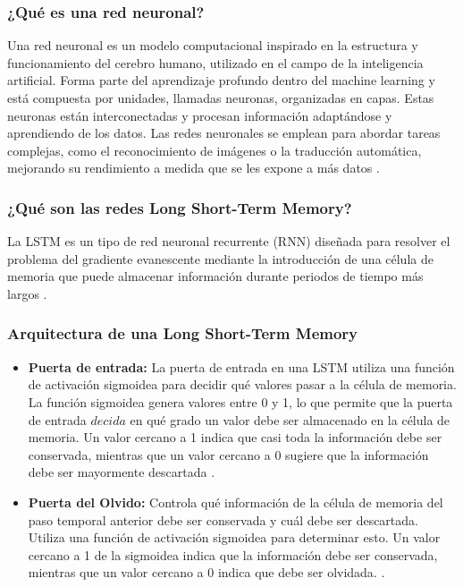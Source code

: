 \subsubsection{¿Qué es una red neuronal?}

Una red neuronal es un modelo computacional inspirado en la estructura y funcionamiento del cerebro humano, utilizado en el campo de la inteligencia artificial. Forma parte del aprendizaje profundo dentro del machine learning y está compuesta por unidades, llamadas neuronas, organizadas en capas. Estas neuronas están interconectadas y procesan información adaptándose y aprendiendo de los datos. Las redes neuronales se emplean para abordar tareas complejas, como el reconocimiento de imágenes o la traducción automática, mejorando su rendimiento a medida que se les expone a más datos \cite{redes-neuoronales}.

\subsubsection{¿Qué son las redes Long Short-Term Memory?}

La LSTM es un tipo de red neuronal recurrente (RNN) diseñada para resolver el problema del gradiente evanescente mediante la introducción de una célula de memoria que puede almacenar información durante periodos de tiempo más largos \cite{redes-lstm-long-short-term-memory}.

\subsubsection{Arquitectura de una Long Short-Term Memory}

\begin{itemize}
    \item \textbf{Puerta de entrada:} La puerta de entrada en una LSTM utiliza una función de activación sigmoidea para decidir qué valores pasar a la célula de memoria. La función sigmoidea genera valores entre 0 y 1, lo que permite que la puerta de entrada \( decida \) en qué grado un valor debe ser almacenado en la célula de memoria. Un valor cercano a 1 indica que casi toda la información debe ser conservada, mientras que un valor cercano a 0 sugiere que la información debe ser mayormente descartada \cite{redes-lstm-long-short-term-memory}.
\end{itemize}

\begin{itemize}
    \item \textbf{Puerta del Olvido:} Controla qué información de la célula de memoria del paso temporal anterior debe ser conservada y cuál debe ser descartada. Utiliza una función de activación sigmoidea para determinar esto. Un valor cercano a 1 de la sigmoidea indica que la información debe ser conservada, mientras que un valor cercano a 0 indica que debe ser olvidada. \cite{redes-lstm-long-short-term-memory}.
\end{itemize}

